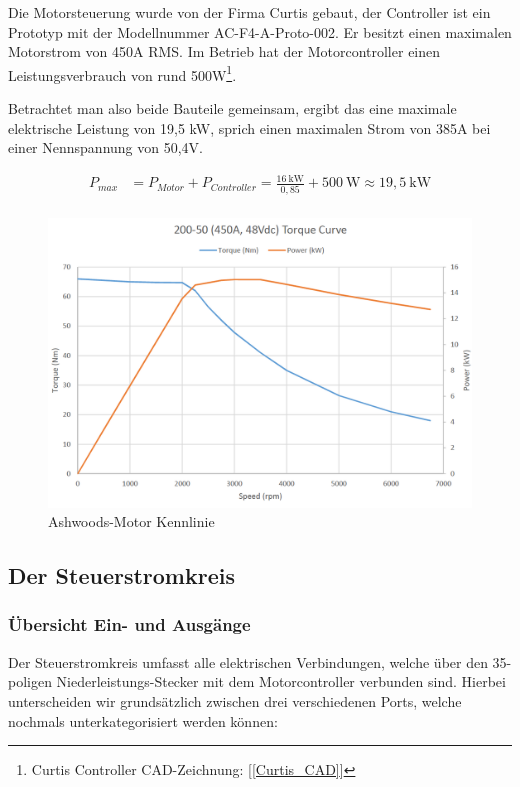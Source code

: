 Die Motorsteuerung wurde von der Firma Curtis gebaut, der Controller ist ein Prototyp mit der Modellnummer \glqq AC-F4-A-Proto-002\grqq{}. Er besitzt einen maximalen Motorstrom von 450A RMS. Im Betrieb hat der Motorcontroller einen Leistungsverbrauch von rund 500W\footnote{Curtis Controller CAD-Zeichnung: [\ref{Curtis_CAD}]}.

Betrachtet man also beide Bauteile gemeinsam, ergibt das eine maximale elektrische Leistung von 19,5 kW, sprich einen maximalen Strom von 385A bei einer Nennspannung von 50,4V. 

\begin{align*}
P_{max} &= 	P_{Motor} + P_{Controller} = \frac{16~\mathrm{kW}}{0,85}  + 500~\mathrm{W} \approx 19,5~\mathrm{kW}\\[3mm]
\end{align*}


\begin{figure}[H]
	\begin{center}
		\includegraphics[width=\textwidth]{figures/Antrieb/Ashwoods_Kennlinie.png}
		\caption{Ashwoods-Motor Kennlinie}
	\end{center}
\end{figure}

\newpage


\subsection{Der Steuerstromkreis}
\label{Steuerstromkreis}
\subsubsection{Übersicht Ein- und Ausgänge}
Der Steuerstromkreis umfasst alle elektrischen Verbindungen, welche über den  35-poligen Niederleistungs-Stecker mit dem Motorcontroller verbunden sind. Hierbei unterscheiden wir grundsätzlich zwischen drei verschiedenen Ports, welche nochmals unterkategorisiert werden können:

